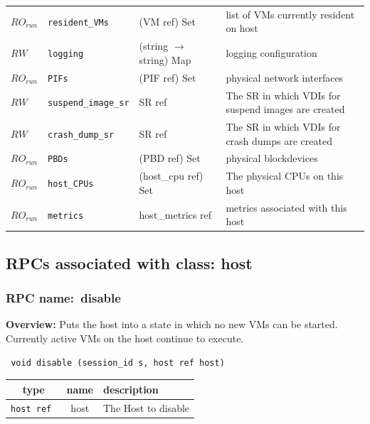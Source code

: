 \begin{longtable}{|lllp{}|}
$\mathit{RO}_\mathit{run}$ &  {\tt resident\_VMs} & (VM ref) Set & list of VMs currently resident on host \\
$\mathit{RW}$ &  {\tt logging} & (string $\rightarrow$ string) Map & logging configuration \\
$\mathit{RO}_\mathit{run}$ &  {\tt PIFs} & (PIF ref) Set & physical network interfaces \\
$\mathit{RW}$ &  {\tt suspend\_image\_sr} & SR ref & The SR in which VDIs for suspend images are created \\
$\mathit{RW}$ &  {\tt crash\_dump\_sr} & SR ref & The SR in which VDIs for crash dumps are created \\
$\mathit{RO}_\mathit{run}$ &  {\tt PBDs} & (PBD ref) Set & physical blockdevices \\
$\mathit{RO}_\mathit{run}$ &  {\tt host\_CPUs} & (host\_cpu ref) Set & The physical CPUs on this host \\
$\mathit{RO}_\mathit{run}$ &  {\tt metrics} & host\_metrics ref & metrics associated with this host \\
\hline
\end{longtable}
\subsection{RPCs associated with class: host}
\subsubsection{RPC name:~disable}

{\bf Overview:} 
Puts the host into a state in which no new VMs can be started. Currently
active VMs on the host continue to execute.

\begin{verbatim} void disable (session_id s, host ref host)\end{verbatim}



 
\vspace{0.3cm}
\begin{tabular}{|c|c|p{7cm}|}
 \hline
{\bf type} & {\bf name} & {\bf description} \\ \hline
{\tt host ref } & host & The Host to disable \\ \hline 

\end{tabular}

\vspace{0.3cm}

